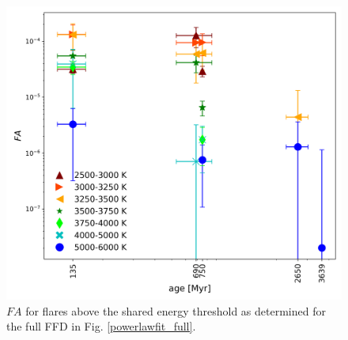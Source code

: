 \documentclass{aa}
\begin{document}
\begin{figure}
    \centering
    \includegraphics[width=13.5cm]{pics/FA/FA_T_age_Ethresh.png}
    \caption{$FA$ for flares above the shared energy threshold as determined for the full FFD in Fig. \ref{powerlawfit_full}.}          
    \label{FA_E}
\end{figure}

\end{document}
